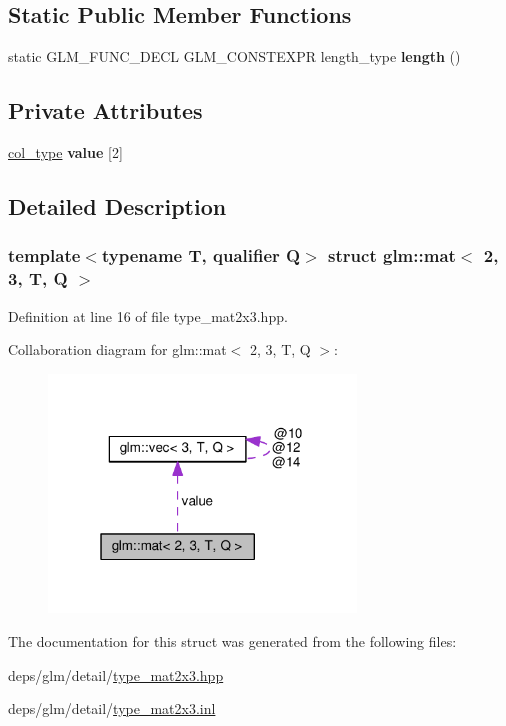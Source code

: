 \subsection*{Static Public Member Functions}
\begin{DoxyCompactItemize}
\item 
\mbox{\label{structglm_1_1mat_3_012_00_013_00_01T_00_01Q_01_4_a77bf3d190cef1bb5d40833ab5913c08f}} 
static G\+L\+M\+\_\+\+F\+U\+N\+C\+\_\+\+D\+E\+CL G\+L\+M\+\_\+\+C\+O\+N\+S\+T\+E\+X\+PR length\+\_\+type {\bfseries length} ()
\end{DoxyCompactItemize}
\subsection*{Private Attributes}
\begin{DoxyCompactItemize}
\item 
\mbox{\label{structglm_1_1mat_3_012_00_013_00_01T_00_01Q_01_4_a6ffb5e68032090a7980ff22e64eff8cf}} 
\hyperlink{structglm_1_1vec_3_013_00_01T_00_01Q_01_4}{col\+\_\+type} {\bfseries value} \mbox{[}2\mbox{]}
\end{DoxyCompactItemize}


\subsection{Detailed Description}
\subsubsection*{template$<$typename T, qualifier Q$>$\newline
struct glm\+::mat$<$ 2, 3, T, Q $>$}



Definition at line 16 of file type\+\_\+mat2x3.\+hpp.



Collaboration diagram for glm\+:\+:mat$<$ 2, 3, T, Q $>$\+:
\nopagebreak
\begin{figure}[H]
\begin{center}
\leavevmode
\includegraphics[width=232pt]{d2/d08/structglm_1_1mat_3_012_00_013_00_01T_00_01Q_01_4__coll__graph}
\end{center}
\end{figure}


The documentation for this struct was generated from the following files\+:\begin{DoxyCompactItemize}
\item 
deps/glm/detail/\hyperlink{type__mat2x3_8hpp}{type\+\_\+mat2x3.\+hpp}\item 
deps/glm/detail/\hyperlink{type__mat2x3_8inl}{type\+\_\+mat2x3.\+inl}\end{DoxyCompactItemize}

